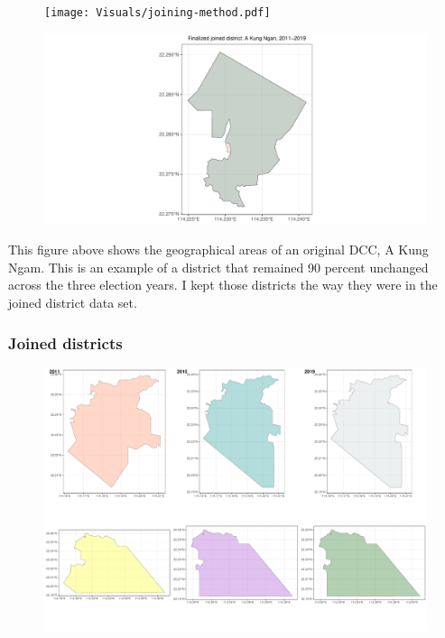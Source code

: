 \documentclass[letterpaper, 12pt]{article}
\begin{document}
\begin{appendices}
\begin{figure}[!h]
    \centering
    \texttt{[image: Visuals/joining-method.pdf]}
    \label{fig:akungngam}
\end{figure}
\begin{figure}[!h]
    \centering
    \includegraphics[scale=0.5]{Visuals/joining-district-unchanged.pdf}
        \label{fig: akungngam_joined}
\end{figure}
This figure above shows the geographical areas of an original DCC, A Kung Ngam. This is an example of a district that remained 90 percent unchanged across the three election years. I kept those districts the way they were in the joined district data set.



\subsubsection*{Joined districts}
\begin{figure}[!h]
    \centering
    \includegraphics[scale=0.4]{Visuals/changed_joined.pdf}
        \label{joined}
\end{figure}


\end{appendices}
\end{document}
